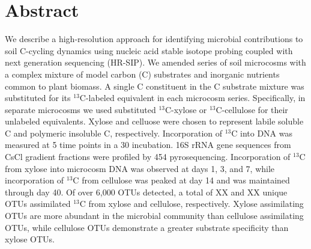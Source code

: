 \section{Abstract}
We describe a high-resolution approach for identifying microbial contributions
to soil C-cycling dynamics using nucleic acid stable isotope probing coupled
with next generation sequencing (HR-SIP). We amended series of soil microcosms
with a complex mixture of model carbon (C) substrates and inorganic nutrients
common to plant biomass. A single C constituent in the C substrate mixture was
substituted for its $^{13}$C-labeled equivalent in each microcosm series.
Specifically, in separate microcosms we used substituted $^{13}$C-xylose or
$^{13}$C-cellulose for their unlabeled equivalents. Xylose and celluose were
chosen to represent labile soluble C and polymeric insoluble C, respectively.
Incorporation of $^{13}$C into DNA was measured at 5 time points in a 30
incubation. 16S rRNA gene sequences from CsCl gradient fractions were profiled
by 454 pyrosequencing. Incorporation of $^{13}$C from xylose into microcosm DNA
was observed at days 1, 3, and 7, while incorporation of $^{13}$C from
cellulose was peaked at day 14 and was maintained through day 40. Of over 6,000
OTUs detected, a total of XX and XX unique OTUs assimilated $^{13}$C from
xylose and cellulose, respectively. Xylose assimilating OTUs are more abundant
in the microbial community than cellulose assimilating OTUs, while cellulose
OTUs demonstrate a greater substrate specificity than xylose OTUs.        
